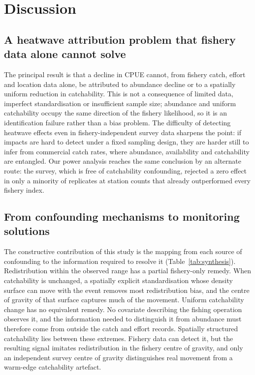 \documentclass[11pt,a4paper]{article}
\begin{document}
\section{Discussion}

\subsection{A heatwave attribution problem that fishery data alone cannot solve}

The principal result is that a decline in CPUE cannot, from fishery catch, effort and location data alone, be attributed to abundance decline or to a spatially uniform reduction in catchability. This is not a consequence of limited data, imperfect standardisation or insufficient sample size; abundance and uniform catchability occupy the same direction of the fishery likelihood, so it is an identification failure rather than a bias problem. The difficulty of detecting heatwave effects even in fishery-independent survey data \citep{fredston2023} sharpens the point: if impacts are hard to detect under a fixed sampling design, they are harder still to infer from commercial catch rates, where abundance, availability and catchability are entangled. Our power analysis reaches the same conclusion by an alternate route: the survey, which is free of catchability confounding, rejected a zero effect in only a minority of replicates at station counts that already outperformed every fishery index.

\subsection{From confounding mechanisms to monitoring solutions}

The constructive contribution of this study is the mapping from each source of confounding to the information required to resolve it (Table~\ref{tab:synthesis}). Redistribution within the observed range has a partial fishery-only remedy. When catchability is unchanged, a spatially explicit standardisation whose density surface can move with the event removes most redistribution bias, and the centre of gravity of that surface captures much of the movement. Uniform catchability change has no equivalent remedy. No covariate describing the fishing operation observes it, and the information needed to distinguish it from abundance must therefore come from outside the catch and effort records. Spatially structured catchability lies between these extremes. Fishery data can detect it, but the resulting signal imitates redistribution in the fishery centre of gravity, and only an independent survey centre of gravity distinguishes real movement from a warm-edge catchability artefact.
\end{document}
